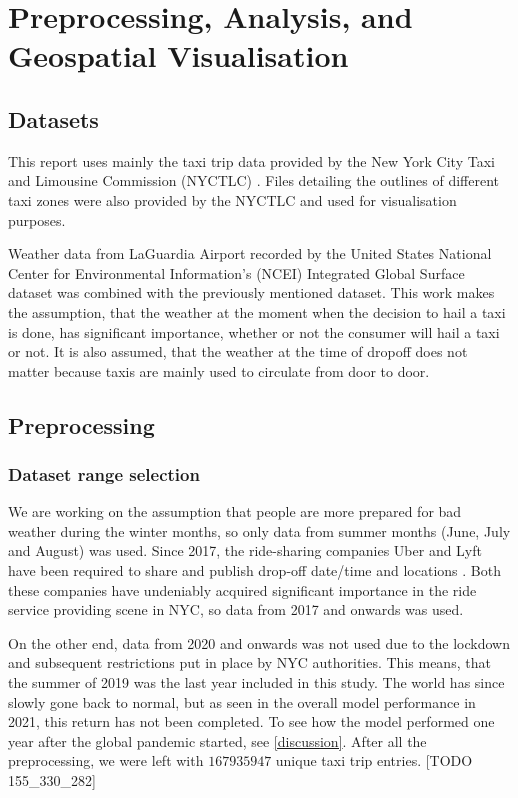 \documentclass[11pt]{article}
\begin{document}
\section{Preprocessing, Analysis, and Geospatial Visualisation}

\subsection{Datasets}
This report uses mainly the taxi trip data provided by the New York City Taxi and Limousine Commission (NYCTLC) \cite{nyctlcData}. Files detailing the outlines of different taxi zones were also provided by the NYCTLC and used for visualisation purposes.

Weather data from LaGuardia Airport recorded by the United States National Center for Environmental Information's (NCEI) Integrated Global Surface dataset \cite{weatherData} was combined with the previously mentioned dataset. This work makes the assumption, that the weather at the moment when the decision to hail a taxi is done, has significant importance, whether or not the consumer will hail a taxi or not. It is also assumed, that the weather at the time of dropoff does not matter because taxis are mainly used to circulate from door to door.

\subsection{Preprocessing}

\subsubsection{Dataset range selection}

We are working on the assumption that people are more prepared for bad weather during the winter months, so only data from summer months (June, July and August) was used. Since 2017, the ride-sharing companies Uber and Lyft have been required to share and publish drop-off date/time and locations \cite{tripUserGuide}. Both these companies have undeniably acquired significant importance in the ride service providing scene in NYC, so data from 2017 and onwards was used. 

On the other end, data from 2020 and onwards was not used due to the lockdown and subsequent restrictions put in place by NYC authorities. This means, that the summer of 2019 was the last year included in this study. The world has since slowly gone back to normal, but as seen in the overall model performance in 2021, this return has not been completed. To see how the model performed one year after the global pandemic started, see \autoref{discussion}. After all the preprocessing, we were left with $167935947$ unique taxi trip entries. [TODO 155\_330\_282]
\end{document}
